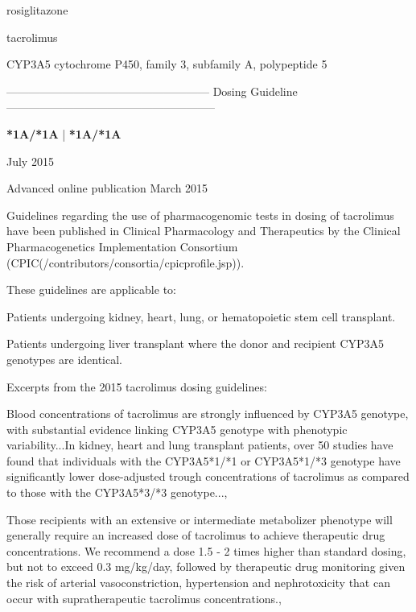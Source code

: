 \documentclass{resume} %
\begin{document}
\begin{rSection}{ rosiglitazone }
\end{rSection}\begin{rSection}{ tacrolimus }
\item[]
\begin{rSubsection}{ CYP3A5 }{ cytochrome P450, family 3, subfamily A, polypeptide 5 }{}{}
\item[]
\item[] ------------------------------------------------------ Dosing Guideline --------------------------------------------------------\newline
\item[]
\item[] \textbf{ *1A/*1A } | \textbf{ *1A/*1A }
\item July 2015
 \newline
\item Advanced online publication March 2015
 \newline
\item Guidelines regarding the use of pharmacogenomic tests in dosing of tacrolimus have been published in Clinical Pharmacology and Therapeutics by the Clinical Pharmacogenetics Implementation Consortium (CPIC(/contributors/consortia/cpicprofile.jsp)). 
 \newline
\item These guidelines are applicable to:
 \newline
\item Patients undergoing kidney, heart, lung, or hematopoietic stem cell transplant.
 \newline
\item Patients undergoing liver transplant where the donor and recipient CYP3A5 genotypes are identical.
 \newline
\item Excerpts from the 2015 tacrolimus dosing guidelines:
 \newline
\item Blood concentrations of tacrolimus are strongly influenced by CYP3A5 genotype, with substantial evidence linking CYP3A5 genotype with phenotypic variability...In kidney, heart and lung transplant patients, over 50 studies have found that individuals with the CYP3A5*1/*1 or CYP3A5*1/*3 genotype have significantly lower dose-adjusted trough concentrations of tacrolimus as compared to those with the CYP3A5*3/*3 genotype..., 
 \newline
\item Those recipients with an extensive or intermediate metabolizer phenotype will generally require an increased dose of tacrolimus to achieve therapeutic drug concentrations. We recommend a dose 1.5 - 2 times higher than standard dosing, but not to exceed 0.3 mg/kg/day, followed by therapeutic drug monitoring given the risk of arterial vasoconstriction, hypertension and nephrotoxicity that can occur with supratherapeutic tacrolimus concentrations.,  

\end{rSubsection}
\end{rSection}
\end{document}
